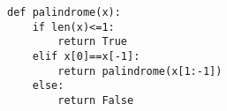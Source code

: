 \question{}

%

%

\begin{lstlisting}
def palindrome(x):
    if len(x)<=1:
        return True
    elif x[0]==x[-1]:
        return palindrome(x[1:-1])
    else:
        return False
\end{lstlisting}